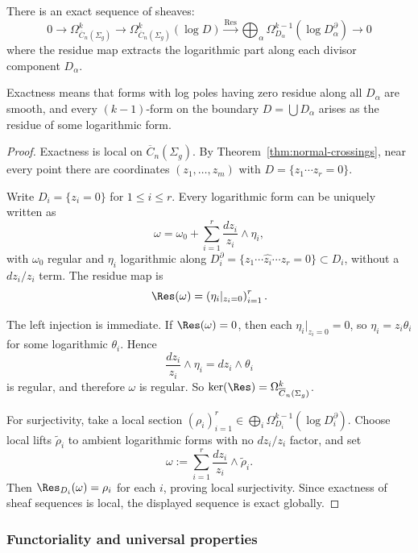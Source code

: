 \begin{theorem}\label{thm:residue-sequence}
There is an exact sequence of sheaves:
\[0 \to \Omega^k_{\overline{C}_n(\Sigma_g)} \to \Omega^k_{\overline{C}_n(\Sigma_g)}(\log D) \xrightarrow{\text{Res}} \bigoplus_{\alpha} \Omega^{k-1}_{D_\alpha}(\log D_\alpha^\partial) \to 0\]
where the residue map extracts the logarithmic part along each divisor component $D_\alpha$.

Exactness means that forms with log poles having zero residue along all $D_\alpha$ are smooth, and every $(k-1)$-form on the boundary $D = \bigcup D_\alpha$ arises as the residue of some logarithmic form.
\end{theorem}

\begin{proof}
Exactness is local on $\overline{C}_n(\Sigma_g)$. By
Theorem~\ref{thm:normal-crossings}, near every point there are coordinates
$(z_1,\dots,z_m)$ with $D=\{z_1\cdots z_r=0\}$.

Write $D_i=\{z_i=0\}$ for $1\le i\le r$. Every logarithmic form can be uniquely
written as
\[
\omega=\omega_0+\sum_{i=1}^r \frac{dz_i}{z_i}\wedge\eta_i,
\]
with $\omega_0$ regular and $\eta_i$ logarithmic along
$D_i^\partial=\{z_1\cdots \widehat{z_i}\cdots z_r=0\}\subset D_i$, without a
$dz_i/z_i$ term. The residue map is
\[
\Res(\omega)=\left(\eta_i|_{z_i=0}\right)_{i=1}^r.
\]

The left injection is immediate. If $\Res(\omega)=0$, then each
$\eta_i|_{z_i=0}=0$, so $\eta_i=z_i\theta_i$ for some logarithmic $\theta_i$.
Hence
\[
\frac{dz_i}{z_i}\wedge \eta_i = dz_i\wedge\theta_i
\]
is regular, and therefore $\omega$ is regular. So
$\ker(\Res)=\Omega^k_{\overline{C}_n(\Sigma_g)}$.

For surjectivity, take a local section
$(\rho_i)_{i=1}^r\in\bigoplus_i\Omega^{k-1}_{D_i}(\log D_i^\partial)$.
Choose local lifts $\widetilde{\rho}_i$ to ambient logarithmic forms with no
$dz_i/z_i$ factor, and set
\[
\omega:=\sum_{i=1}^r \frac{dz_i}{z_i}\wedge \widetilde{\rho}_i.
\]
Then $\Res_{D_i}(\omega)=\rho_i$ for each $i$, proving local surjectivity. Since
exactness of sheaf sequences is local, the displayed sequence is exact globally.
\end{proof}

\subsubsection{Functoriality and universal properties}

